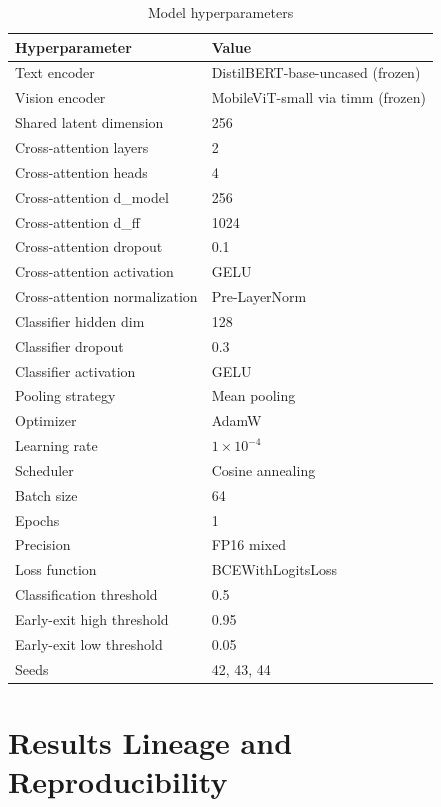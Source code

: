 \documentclass[10pt,twoside]{article}
\begin{document}
\begin{table}[h]
\centering
\caption{Model hyperparameters}
\label{tab:apphyper}
\small
\begin{tabular}{ll}
\toprule
Hyperparameter & Value \\
\midrule
Text encoder & DistilBERT-base-uncased (frozen) \\
Vision encoder & MobileViT-small via timm (frozen) \\
Shared latent dimension & 256 \\
Cross-attention layers & 2 \\
Cross-attention heads & 4 \\
Cross-attention d\_model & 256 \\
Cross-attention d\_ff & 1024 \\
Cross-attention dropout & 0.1 \\
Cross-attention activation & GELU \\
Cross-attention normalization & Pre-LayerNorm \\
Classifier hidden dim & 128 \\
Classifier dropout & 0.3 \\
Classifier activation & GELU \\
Pooling strategy & Mean pooling \\
Optimizer & AdamW \\
Learning rate & $1 \times 10^{-4}$ \\
Scheduler & Cosine annealing \\
Batch size & 64 \\
Epochs & 1 \\
Precision & FP16 mixed \\
Loss function & BCEWithLogitsLoss \\
Classification threshold & 0.5 \\
Early-exit high threshold & 0.95 \\
Early-exit low threshold & 0.05 \\
Seeds & 42, 43, 44 \\
\bottomrule
\end{tabular}
\end{table}

\section{Results Lineage and Reproducibility}\label{app:lineage}
\end{document}
